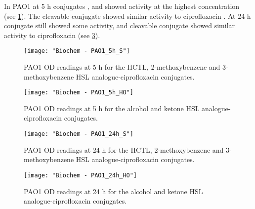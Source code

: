 

In PAO1 at 5 h conjugates ,  and  showed activity at the highest concentration (see \ref{fgr:PAO1_5h_S}). 
The cleavable conjugate  showed similar activity to ciprofloxacin .
At 24 h conjugate  still showed some activity, and
cleavable conjugate  showed similar activity to ciprofloxacin  (see \ref{fgr:PAO1_24h_S}).




\begin{figure}[H]
	\begin{center}
		\texttt{[image: "Biochem - PAO1\_5h\_S"]}
		\caption{PAO1 OD readings at 5 h for the HCTL, 2-methoxybenzene and 3-methoxybenzene HSL analogue-ciprofloxacin conjugates.\label{fgr:PAO1_5h_S}}
	\end{center}
\end{figure}

\begin{figure}[H]
	\begin{center}
		\texttt{[image: "Biochem - PAO1\_5h\_HO"]}
		\caption{PAO1 OD readings at 5 h for the alcohol and ketone HSL analogue-ciprofloxacin conjugates.\label{fgr:PAO1_5h_HO}}
	\end{center}
\end{figure}


\begin{figure}[H]
	\begin{center}
		\texttt{[image: "Biochem - PAO1\_24h\_S"]}
		\caption{PAO1 OD readings at 24 h for the HCTL, 2-methoxybenzene and 3-methoxybenzene HSL analogue-ciprofloxacin conjugates.\label{fgr:PAO1_24h_S}}
	\end{center}
\end{figure}

\begin{figure}[H]
	\begin{center}
		\texttt{[image: "Biochem - PAO1\_24h\_HO"]}
		\caption{PAO1 OD readings at 24 h for the alcohol and ketone HSL analogue-ciprofloxacin conjugates.\label{fgr:PAO1_24h_HO}}
	\end{center}
\end{figure}





